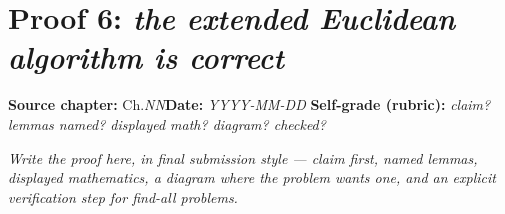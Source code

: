 \documentclass[11pt]{article}
\begin{document}
\section*{Proof 6: \emph{the extended Euclidean algorithm is correct}}
\textbf{Source chapter:} Ch.\emph{NN}\quad \textbf{Date:} \emph{YYYY-MM-DD}\quad
\textbf{Self-grade (rubric):} \emph{claim? lemmas named? displayed math? diagram? checked?}
\medskip

\emph{Write the proof here, in final submission style — claim first, named lemmas,
displayed mathematics, a diagram where the problem wants one, and an explicit
verification step for find-all problems.}
\end{document}
